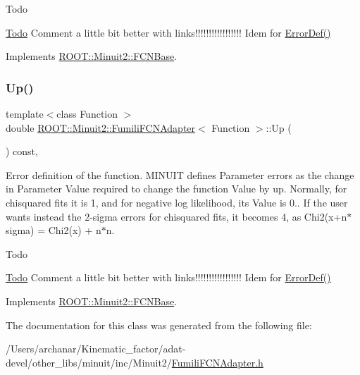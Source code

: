 \begin{DoxyRefDesc}{Todo}
\item[\mbox{\hyperlink{todo__todo000001}{Todo}}]Comment a little bit better with links!!!!!!!!!!!!!!!!! Idem for \mbox{\hyperlink{classROOT_1_1Minuit2_1_1FCNBase_ac4592475c58a65b037ba97ab5f3cba10}{Error\+Def()}}\end{DoxyRefDesc}


Implements \mbox{\hyperlink{classROOT_1_1Minuit2_1_1FCNBase_a04ef08ddad92ce8d89d498efbe021c39}{R\+O\+O\+T\+::\+Minuit2\+::\+F\+C\+N\+Base}}.

\mbox{\label{classROOT_1_1Minuit2_1_1FumiliFCNAdapter_aeed5b77f0bcca4854a9e6b0620ab3cb9}} 
\subsubsection{\texorpdfstring{Up()}{Up()}\hspace{0.1cm}{\footnotesize\ttfamily [3/3]}}
{\footnotesize\ttfamily template$<$class Function $>$ \\
double \mbox{\hyperlink{classROOT_1_1Minuit2_1_1FumiliFCNAdapter}{R\+O\+O\+T\+::\+Minuit2\+::\+Fumili\+F\+C\+N\+Adapter}}$<$ Function $>$\+::Up (\begin{DoxyParamCaption}{ }\end{DoxyParamCaption}) const\hspace{0.3cm}{\ttfamily [inline]}, {\ttfamily [virtual]}}

Error definition of the function. M\+I\+N\+U\+IT defines Parameter errors as the change in Parameter Value required to change the function Value by up. Normally, for chisquared fits it is 1, and for negative log likelihood, its Value is 0.. If the user wants instead the 2-\/sigma errors for chisquared fits, it becomes 4, as Chi2(x+n$\ast$sigma) = Chi2(x) + n$\ast$n.

\begin{DoxyRefDesc}{Todo}
\item[\mbox{\hyperlink{todo__todo000001}{Todo}}]Comment a little bit better with links!!!!!!!!!!!!!!!!! Idem for \mbox{\hyperlink{classROOT_1_1Minuit2_1_1FCNBase_ac4592475c58a65b037ba97ab5f3cba10}{Error\+Def()}}\end{DoxyRefDesc}


Implements \mbox{\hyperlink{classROOT_1_1Minuit2_1_1FCNBase_a04ef08ddad92ce8d89d498efbe021c39}{R\+O\+O\+T\+::\+Minuit2\+::\+F\+C\+N\+Base}}.



The documentation for this class was generated from the following file\+:\begin{DoxyCompactItemize}
\item 
/\+Users/archanar/\+Kinematic\+\_\+factor/adat-\/devel/other\+\_\+libs/minuit/inc/\+Minuit2/\mbox{\hyperlink{adat-devel_2other__libs_2minuit_2inc_2Minuit2_2FumiliFCNAdapter_8h}{Fumili\+F\+C\+N\+Adapter.\+h}}\end{DoxyCompactItemize}
